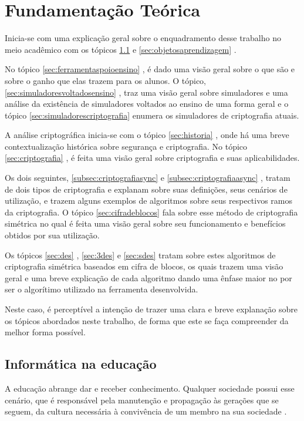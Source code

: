 \chapter{Fundamentação Teórica}
\label{char:fundteorica}
Inicia-se com uma explicação geral sobre o enquadramento desse trabalho no meio acadêmico com os tópicos \ref{sec:informaticaeducacao}  e \ref{sec:objetosaprendizagem} .
 
No tópico \ref{sec:ferramentaspoioensino} , é dado uma visão geral sobre o que são e sobre o ganho que elas trazem para os alunos. O tópico, \ref{sec:simuladoresvoltadosensino} , traz uma visão geral sobre simuladores e uma análise da existência de simuladores voltados ao ensino de uma forma geral e o tópico \ref{sec:simuladorescriptografia} enumera os simuladores de criptografia atuais.

A análise criptográfica inicia-se com o tópico \ref{sec:historia} , onde há uma breve contextualização histórica sobre segurança e criptografia. No tópico \ref{sec:criptografia} , é feita uma visão geral sobre criptografia e suas aplicabilidades. 

Os dois seguintes, \ref{subsec:criptografiasync}  e \ref{subsec:criptografiaasync} , tratam de dois tipos de criptografia e explanam sobre suas definições, seus cenários de utilização, e trazem alguns exemplos de algoritmos sobre seus respectivos ramos da criptografia. O tópico \ref{sec:cifradeblocos}  fala sobre esse método de criptografia simétrica no qual é feita uma visão geral sobre seu funcionamento e benefícios obtidos por sua utilização.

Os tópicos \ref{sec:des} , \ref{sec:3des}  e \ref{sec:sdes}  tratam sobre estes algoritmos de criptografia simétrica baseados em cifra de blocos, os quais trazem uma visão geral e uma breve explicação de cada algoritmo dando uma ênfase maior no  por ser o algorítimo utilizado na ferramenta desenvolvida.

Neste caso, é perceptível a intenção de trazer uma clara e breve explanação sobre os tópicos abordados neste trabalho, de forma que este se faça compreender da melhor forma possível.

\section{Informática na educação}
\label{sec:informaticaeducacao}
A educação abrange dar e receber conhecimento. Qualquer sociedade possui esse cenário, que é responsável pela manutenção e propagação às gerações que se seguem, da cultura necessária à convivência de um membro na sua sociedade \cite{hamawaki09}.

